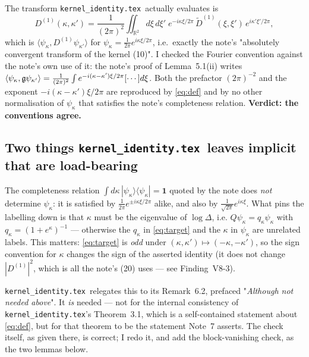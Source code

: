 \documentclass[11pt]{article}
\newcommand{\Dt}{\widetilde D^{(1)}}\newcommand{\Qt}{\widetilde Q}
\newcommand{\KI}{\texttt{kernel\_identity.tex}}\newcommand{\NOTE}{\texttt{universality\_normalization.tex}}
\begin{document}
The transform \KI\ actually evaluates is
\begin{equation}\label{eq:def}
 D^{(1)}(\kappa,\kappa')=\frac1{(2\pi)^2}\iint_{\mathbb R^2}d\xi\,d\xi'\;
 e^{-i\kappa\xi/2\pi}\,\Dt(\xi,\xi')\,e^{i\kappa'\xi'/2\pi},
\end{equation}
which is \(\langle\psi_\kappa,D^{(1)}\psi_{\kappa'}\rangle\) for \(\psi_\kappa=\frac1{2\pi}
e^{i\kappa\xi/2\pi}\), i.e.\ exactly the note's "absolutely convergent transform of the kernel
(10)".  I checked the Fourier convention against the note's own use of it: the note's proof of
Lemma~5.1(ii) writes \(\langle\psi_\kappa,\mathfrak g\psi_{\kappa'}\rangle=\frac1{(2\pi)^2}\int
e^{-i(\kappa-\kappa')\xi/2\pi}[\cdots]d\xi\).  Both the prefactor \((2\pi)^{-2}\) and the exponent
\(-i(\kappa-\kappa')\xi/2\pi\) are reproduced by \eqref{eq:def} and by no other normalisation of
\(\psi_\kappa\) that satisfies the note's completeness relation.  \textbf{Verdict: the conventions
agree.}

\subsection{Two things \KI\ leaves implicit that are load-bearing}

The completeness relation \(\int d\kappa\,|\psi_\kappa\rangle\langle\psi_\kappa|=\mathbf 1\) quoted
by the note does \emph{not} determine \(\psi_\kappa\): it is satisfied by
\(\frac1{2\pi}e^{\pm i\kappa\xi/2\pi}\) alike, and also by \(\frac1{\sqrt{2\pi}}e^{i\kappa\xi}\).
What pins the labelling down is that \(\kappa\) must be the eigenvalue of \(\log\Delta\), i.e.
\(Q\psi_\kappa=q_\kappa\psi_\kappa\) with \(q_\kappa=(1+e^\kappa)^{-1}\) --- otherwise the \(q_\kappa\)
in \eqref{eq:target} and the \(\kappa\) in \(\psi_\kappa\) are unrelated labels.  This matters:
\eqref{eq:target} is \emph{odd} under \((\kappa,\kappa')\mapsto(-\kappa,-\kappa')\), so the sign
convention for \(\kappa\) changes the sign of the asserted identity (it does not change
\(|D^{(1)}|^2\), which is all the note's (20) uses --- see Finding~V8-3).

\KI\ relegates this to its Remark~6.2, prefaced "\emph{Although not needed above}".  It \emph{is}
needed --- not for the internal consistency of \KI's Theorem~3.1, which is a self-contained
statement about \eqref{eq:def}, but for that theorem to be the statement Note~7 asserts.  The check
itself, as given there, is correct; I redo it, and add the block-vanishing check, as the two lemmas
below.
\end{document}
